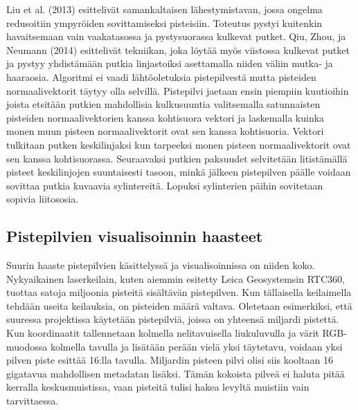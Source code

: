 Liu et al. (2013) esittelivät samankaltaisen lähestymistavan, jossa ongelma redusoitiin ympyröiden sovittamiseksi pisteisiin. \cite{liu} Toteutus pystyi kuitenkin havaitsemaan vain vaakatasossa ja pystysuorassa kulkevat putket. Qiu, Zhou, ja Neumann (2014) esittelivät tekniikan, joka löytää myös viistossa kulkevat putket ja pystyy yhdistämään putkia linjastoiksi asettamalla niiden väliin mutka- ja haaraosia. Algoritmi ei vaadi lähtöoletuksia pistepilvestä mutta pisteiden normaalivektorit täytyy olla selvillä. Pistepilvi jaetaan ensin piempiin kuutioihin joista etsitään putkien mahdollisia kulkusuuntia valitsemalla satunnaisten pisteiden normaalivektorien kanssa kohtisuora vektori ja laskemalla kuinka monen muun pisteen normaalivektorit ovat sen kanssa kohtisuoria. Vektori tulkitaan putken keskilinjaksi kun tarpeeksi monen pisteen normaalivektorit ovat sen kanssa kohtisuorassa. Seuraavaksi putkien paksuudet selvitetään litistämällä pisteet keskilinjojen suuntaisesti tasoon, minkä jälkeen pistepilven päälle voidaan sovittaa putkia kuvaavia sylintereitä. Lopuksi sylinterien päihin sovitetaan sopivia liitososia. \cite{qiu}


\subsection{Pistepilvien visualisoinnin haasteet}

Suurin haaste pistepilvien käsittelyssä ja visualisoinnissa on niiden koko. Nykyaikainen laserkeilain, kuten aiemmin esitetty Leica Geosystemsin RTC360, tuottaa satoja miljoonia pisteitä sisältävän pistepilven. Kun tällaisella keilaimella tehdään useita keilauksia, on pisteiden määrä valtava. Oletetaan esimerkiksi, että suuressa projektissa käytetään pistepilviä, joissa on yhteensä miljardi pistettä. Kun koordinaatit tallennetaan kolmella nelitavuisella liukuluvulla ja värit RGB-muodossa kolmella tavulla ja lisätään perään vielä yksi täytetavu, voidaan yksi pilven piste esittää 16:lla tavulla. Miljardin pisteen pilvi olisi siis kooltaan 16 gigatavua mahdollisen metadatan lisäksi. Tämän kokoista pilveä ei haluta pitää kerralla keskusmuistissa, vaan pisteitä tulisi hakea levyltä muistiin vain tarvittaessa. 


